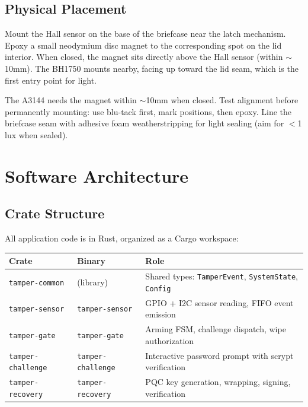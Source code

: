 \documentclass[11pt,letterpaper]{article}
\begin{document}
\subsection{Physical Placement}

Mount the Hall sensor on the base of the briefcase near the latch mechanism. Epoxy a small neodymium disc magnet to the corresponding spot on the lid interior. When closed, the magnet sits directly above the Hall sensor (within $\sim$10mm). The BH1750 mounts nearby, facing up toward the lid seam, which is the first entry point for light.

\begin{securitybox}
The A3144 needs the magnet within $\sim$10mm when closed. Test alignment before permanently mounting: use blu-tack first, mark positions, then epoxy. Line the briefcase seam with adhesive foam weatherstripping for light sealing (aim for $<$1 lux when sealed).
\end{securitybox}


\section{Software Architecture}

\subsection{Crate Structure}

All application code is in Rust, organized as a Cargo workspace:

\begin{xltabular}{\textwidth}{L{3.4cm} L{3.4cm} Y}
\toprule
\textbf{Crate} & \textbf{Binary} & \textbf{Role} \\
\midrule
\endhead
\texttt{tamper-common} & (library) & Shared types: \texttt{TamperEvent}, \texttt{SystemState}, \texttt{Config} \\
\texttt{tamper-sensor} & \texttt{tamper-sensor} & GPIO + I2C sensor reading, FIFO event emission \\
\texttt{tamper-gate} & \texttt{tamper-gate} & Arming FSM, challenge dispatch, wipe authorization \\
\texttt{tamper-challenge} & \texttt{tamper-challenge} & Interactive password prompt with scrypt verification \\
\texttt{tamper-recovery} & \texttt{tamper-recovery} & PQC key generation, wrapping, signing, verification \\*
\bottomrule
\end{xltabular}
\end{document}
